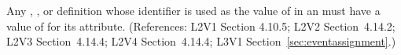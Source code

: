 Any \Compartment, \Species, \Parameter or \SpeciesReference definition whose identifier is
used as the value of  in an \EventAssignment must have a
value of  for its  attribute.  (References: 
L2V1 Section 4.10.5; L2V2 Section~4.14.2; L2V3 Section~4.14.4; L2V4 
Section~4.14.4; L3V1 Section~\ref{sec:eventassignment}.)
